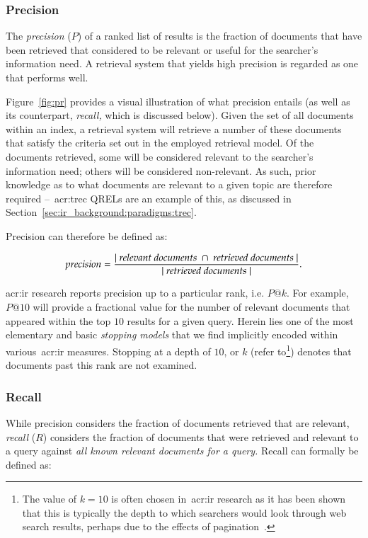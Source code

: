 \subsubsection{Precision}\label{sec:ir_background:evaluation:system:precision}
The \emph{precision} ($P$) of a ranked list of results is the fraction of documents that have been retrieved that considered to be relevant or useful for the searcher's information need. A retrieval system that yields high precision is regarded as one that performs well. 

Figure~\ref{fig:pr} provides a visual illustration of what precision entails (as well as its counterpart, \emph{recall,} which is discussed below). Given the set of all documents within an index, a retrieval system will retrieve a number of these documents that satisfy the criteria set out in the employed retrieval model. Of the documents retrieved, some will be considered relevant to the searcher's information need; others will be considered non-relevant. As such, prior knowledge as to what documents are relevant to a given topic are therefore required --~\gls{acr:trec} QRELs are an example of this, as discussed in Section~\ref{sec:ir_background:paradigms:trec}.

Precision can therefore be defined as:

\begin{equation*}
precision = \frac{|~\text{\emph{relevant documents}}~\cap~\text{\emph{retrieved documents}}~|}{|~\text{\emph{retrieved documents}}~|}.
\end{equation*}

\gls{acr:ir} research reports precision up to a particular rank, i.e. $P@k$. For example, $P@10$ will provide a fractional value for the number of relevant documents that appeared within the top $10$ results for a given query. Herein lies one of the most elementary and basic \emph{stopping models} that we find implicitly encoded within various~\gls{acr:ir} measures. Stopping at a depth of $10$, or $k$ (refer to\footnote{The value of $k=10$ is often chosen in~\gls{acr:ir} research as it has been shown that this is typically the depth to which searchers would look through web search results, perhaps due to the effects of pagination~\citep{jansen2006www}.}) denotes that documents past this rank are not examined.

\subsubsection{Recall}\label{sec:ir_background:evaluation:system:recall}
While precision considers the fraction of documents retrieved that are relevant, \emph{recall} ($R$) considers the fraction of documents that were retrieved and relevant to a query against \emph{all known relevant documents for a query.} Recall can formally be defined as:

